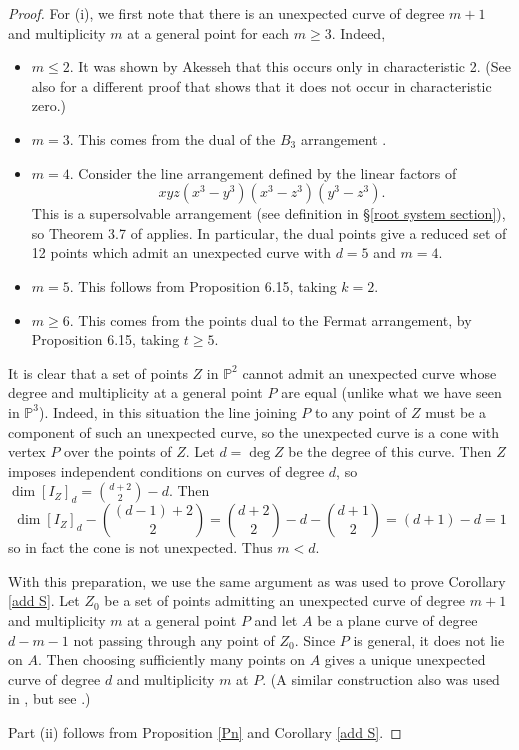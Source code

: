 \documentclass[12pt]{amsart}
\numberwithin{equation}{section}
\theoremstyle{definition}
\newcommand{\PP}{ \ensuremath{\mathbb{P}}}
\begin{document}
\begin{proof}
For (i), we first note that there is an unexpected curve of degree $m+1$ and multiplicity $m$ at a general point for each $m \geq 3$. Indeed, 

\begin{itemize}

\item $m \leq 2$. It was shown by Akesseh \cite{A} that this occurs only 
in characteristic 2. (See also \cite{FGST} for a different proof that shows that it does not occur in characteristic zero.)

\item $m=3$. This comes from the dual of the $B_3$ arrangement \cite{DIV}. 

\item $m=4$. Consider the line arrangement defined by the linear factors of
$$xyz(x^3-y^3)(x^3-z^3)(y^3-z^3).$$ This is a supersolvable arrangement (see definition in \S\ref{root system section}), so Theorem 3.7 of \cite{DMO} applies. In particular, the 
dual points give a reduced set of 12 points which admit an unexpected curve with $d=5$ and $m=4$.

\item $m=5$. This follows from \cite{CHMN} Proposition 6.15, taking $k=2$. 

\item $m \geq 6$. This comes from the points dual to the Fermat arrangement, by \cite{CHMN} Proposition 6.15, taking $t \geq 5$.

\end{itemize}

\noindent It is  clear that a set of points $Z$ in $\PP^2$ cannot admit an unexpected curve  whose degree and multiplicity at a 
general point $P$ are equal (unlike what we have seen in $\PP^3$). Indeed, in this situation the line joining $P$ to any point of $Z$ 
must be a component of such an unexpected curve, so the unexpected curve is a cone with vertex $P$ over the points of $Z$. 
Let $d = \deg Z$ be the degree of this curve. Then $Z$ imposes independent conditions on curves of degree $d$, so $\dim [I_Z]_d = \binom{d+2}{2} - d$. Then 
\[
\dim [I_Z]_d - \binom{(d-1)+2}{2} = \binom{d+2}{2} - d - \binom{d+1}{2} = (d+1)-d = 1
\]
so in fact the cone is not unexpected. Thus  $m < d$.

With this preparation, we use the same argument as was used to prove Corollary \ref{add S}. Let $Z_0$ be a set of points admitting an 
unexpected curve of degree $m+1$ and multiplicity $m$ at a general point $P$ and let $A$ be a plane curve of degree $d-m-1$ not 
passing through any point of $Z_0$. Since $P$ is general, it does not lie on $A$. Then choosing sufficiently many points on $A$ gives 
a unique unexpected curve of degree $d$ and multiplicity $m$ at $P$. (A similar construction also was used in \cite[Proposition 6.7]{DIV},
but see \cite[Example 7.4]{CHMN}.)

Part (ii) follows from Proposition \ref{Pn} and Corollary \ref{add S}.
\end{proof}
\end{document}
